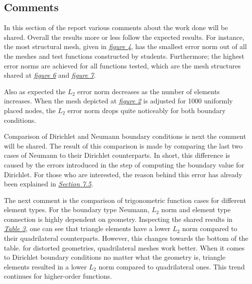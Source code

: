 \documentclass[a4paper, 12pt]{article}
\begin{document}
\subsection{Comments}
\par In this section of the report various comments about the work done will be shared. Overall the results more or less follow the expected results. For instance, the most structural mesh, given in \hyperref[f4]{\textit{figure 4}}, has the smallest error norm out of all the meshes and test functions constructed by students. Furthermore; the highest error norms are achieved for all functions tested, which are the mesh structures shared at \hyperref[f6]{\textit{figure 6}} and \hyperref[f7]{\textit{figure 7}}.\\\par
Also as expected the $L_2$ error norm decreases as the number of elements increases. When the mesh depicted at \hyperref[here]{\textit{figure 2}} is adjusted for 1000 uniformly placed nodes, the $L_2$ error norm drops quite noticeably for both boundary conditions.\\\par
Comparison of Dirichlet and Neumann boundary conditions is next the comment will be shared. The result of this comparison is made by comparing the last two cases of Neumann to their Dirichlet counterparts. In short, this difference is caused by the errors introduced in the step of computing the boundary value for Dirichlet. For those who are interested, the reason behind this error has already been explained in \hyperref[s7.5]{\textit{Section 7.5}}. \\\par
The next comment is the comparison of trigonometric function cases for different element types. For the boundary type Neumann, $L_2$ norm and element type connection is highly dependent on geometry. Inspecting the shared results in \hyperref[T3]{\textit{Table 3}}, one can see that triangle elements have a lower $L_2$ norm compared to their quadrilateral counterparts. However, this changes towards the bottom of the table. for distorted geometries, quadrilateral meshes work better. When it comes to Dirichlet boundary conditions no matter what the geometry is, triangle elements resulted in a lower $L_2$ norm compared to quadrilateral ones. This trend continues for higher-order functions.\\\par
\end{document}

